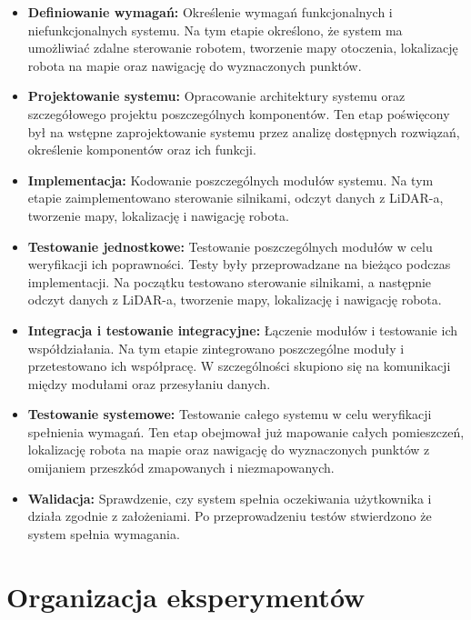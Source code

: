 \documentclass[a4paper,twoside,12pt]{book}
\begin{document}
\begin{itemize}
	\item \textbf{Definiowanie wymagań:} Określenie wymagań funkcjonalnych i niefunkcjonalnych systemu. Na tym etapie określono, że system ma umożliwiać zdalne sterowanie robotem, tworzenie mapy otoczenia, lokalizację robota na mapie oraz nawigację do wyznaczonych punktów.
	\item \textbf{Projektowanie systemu:} Opracowanie architektury systemu oraz szczegółowego projektu poszczególnych komponentów. Ten etap poświęcony był na wstępne zaprojektowanie systemu przez analizę dostępnych rozwiązań, określenie komponentów oraz ich funkcji.
	\item \textbf{Implementacja:} Kodowanie poszczególnych modułów systemu. Na tym etapie zaimplementowano sterowanie silnikami, odczyt danych z LiDAR-a, tworzenie mapy, lokalizację i nawigację robota.
	\item \textbf{Testowanie jednostkowe:} Testowanie poszczególnych modułów w celu weryfikacji ich poprawności. Testy były przeprowadzane na bieżąco podczas implementacji. Na początku testowano sterowanie silnikami, a następnie odczyt danych z LiDAR-a, tworzenie mapy, lokalizację i nawigację robota.
	\item \textbf{Integracja i testowanie integracyjne:} Łączenie modułów i testowanie ich współdziałania. Na tym etapie zintegrowano poszczególne moduły i przetestowano ich współpracę. W szczególności skupiono się na komunikacji między modułami oraz przesyłaniu danych.
	\item \textbf{Testowanie systemowe:} Testowanie całego systemu w celu weryfikacji spełnienia wymagań. Ten etap obejmował już mapowanie całych pomieszczeń, lokalizację robota na mapie oraz nawigację do wyznaczonych punktów z omijaniem przeszkód zmapowanych i niezmapowanych.
	\item \textbf{Walidacja:} Sprawdzenie, czy system spełnia oczekiwania użytkownika i działa zgodnie z założeniami. Po przeprowadzeniu testów stwierdzono że system spełnia wymagania.
\end{itemize}

\section{Organizacja eksperymentów}
\end{document}
